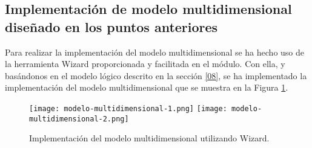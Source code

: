 \medskip
\subsection{Implementación de modelo multidimensional diseñado en los puntos anteriores}
\label{11}
Para realizar la implementación del modelo multidimensional se ha hecho uso de la herramienta Wizard proporcionada y facilitada en el módulo. Con ella, y basándonos en el modelo lógico descrito en la sección \ref{08}, se ha implementado la implementación del modelo multidimensional que se muestra en la Figura \ref{modelo-multidimensional}.

\begin{figure}[!th]
\texttt{[image: modelo-multidimensional-1.png]}
\texttt{[image: modelo-multidimensional-2.png]}
\centering
\caption{Implementación del modelo multidimensional utilizando Wizard.}
\label{modelo-multidimensional}
\end{figure}
